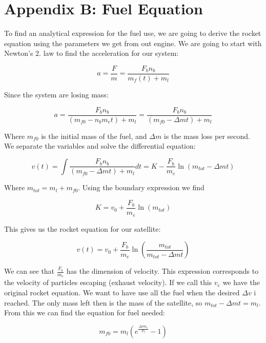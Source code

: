 \documentclass[a4paper, 10pt]{article}
\begin{document}
\section{Appendix B: Fuel Equation}\label{sec:Fuel}

To find an analytical expression for the fuel use, we are going to derive the rocket equation using the parameters we get from out engine. We are going to start with Newton's 2. law to find the acceleration for our system:

\begin{equation}
a = \frac{F}{m} = \frac{F_b n_b}{m_f(t) + m_l} 
\end{equation}

Since the system are losing mass:

\begin{equation}
a = \frac{F_b n_b}{(m_{f0} - n_b m_e t) + m_l} = \frac{F_b n_b}{(m_{f0} - \Delta m t) + m_l}
\end{equation} 

Where $m_{f0}$ is the initial mass of the fuel, and $\Delta m$ is the mass loss per second. We separate the variables and solve the differential equation:

\begin{equation}
v(t) = \int \frac{F_b n_b}{(m_{f0} - \Delta m t) + m_l} dt
= K - \frac{F_b}{m_e} \ln(m_{tot} - \Delta m t) 
\end{equation}

Where $m_{tot} = m_l + m_{f0}$. Using the boundary expression we find

\begin{equation}
K = v_0 + \frac{F_b}{m_e} \ln (m_{tot})
\end{equation}

This gives us the rocket equation for our satellite: 

\begin{equation}
v(t) =v_0 + \frac{F_b}{m_e} \ln \left(\frac{m_{tot}}{m_{tot} - \Delta m t} \right)
\end{equation}

We can see that $\frac{F_b}{m_e}$ has the dimension of velocity. This expression corresponds to the velocity of particles escaping (exhaust velocity). If we call this $v_e$ we have the original rocket equation. We want to have use all the fuel when the desired $\Delta v$ i reached. The only mass left then is the mass of the satellite, so $m_{tot} - \Delta m t = m_l$. From this we can find the equation for fuel needed:

\begin{equation}
m_{f0} = m_l(e^{\frac{\Delta v m_e}{F_b}} - 1)
\end{equation}
\end{document}
